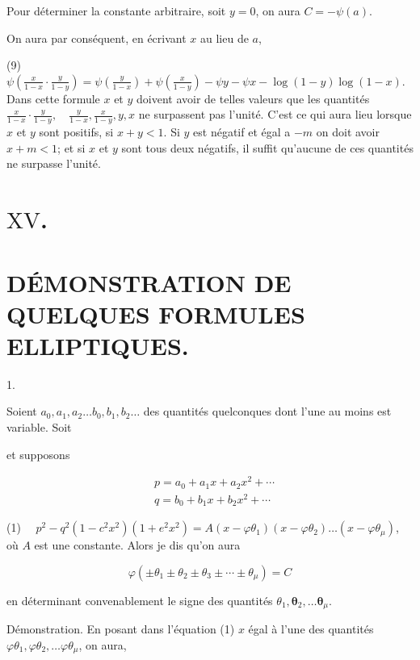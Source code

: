 \documentclass{article}
\begin{document}
Pour déterminer la constante arbitraire, soit \(y=0\), on aura \(C=-\psi(a)\).

On aura par conséquent, en écrivant \(x\) au lieu de \(a\),

(9) \(\psi\left(\frac{x}{1-x} \cdot \frac{y}{1-y}\right)=\psi\left(\frac{y}{1-x}\right)+\psi\left(\frac{x}{1-y}\right)-\psi y-\psi x-\log (1-y) \log (1-x)\). Dans cette formule \(x\) et \(y\) doivent avoir de telles valeurs que les quantités \(\frac{x}{1-x} \cdot \frac{y}{1-y}, \quad \frac{y}{1-x}, \frac{x}{1-y}, y, x\) ne surpassent pas l'unité. C'est ce qui aura lieu lorsque \(x\) et \(y\) sont positifs, si \(x+y<1\). Si \(y\) est négatif et égal a \(-m\) on doit avoir \(x+m<1\); et si \(x\) et \(y\) sont tous deux négatifs, il suffit qu'aucune de ces quantités ne surpasse l'unité.

\section*{\(\mathrm{XV}\).}

\section*{DÉMONSTRATION DE QUELQUES FORMULES ELLIPTIQUES.}

1.

Soient \(a_{0}, a_{1}, a_{2} \ldots b_{0}, b_{1}, b_{2} \ldots\) des quantités quelconques dont l'une au moins est variable. Soit

et supposons

\[
\begin{aligned}
& p=a_{0}+a_{1} x+a_{2} x^{2}+\cdots \\
& q=b_{0}+b_{1} x+b_{2} x^{2}+\cdots
\end{aligned}
\]

(1) \(\quad p^{2}-q^{2}\left(1-c^{2} x^{2}\right)\left(1+e^{2} x^{2}\right)=A\left(x-\varphi \theta_{1}\right)\left(x-\varphi \theta_{2}\right) \ldots\left(x-\varphi \theta_{\mu}\right)\), où \(A\) est une constante. Alors je dis qu'on aura

\[
\varphi\left( \pm \theta_{1} \pm \theta_{2} \pm \theta_{3} \pm \cdots \pm \theta_{\mu}\right)=C
\]

en déterminant convenablement le signe des quantités \(\theta_{1}, \boldsymbol{\theta}_{2}, \ldots \boldsymbol{\theta}_{\mu}\).

Démonstration. En posant dans l'équation (1) \(x\) égal à l'une des quantités \(\varphi \theta_{1}, \varphi \theta_{2}, \ldots \varphi \theta_{\mu}\), on aura,
\end{document}
